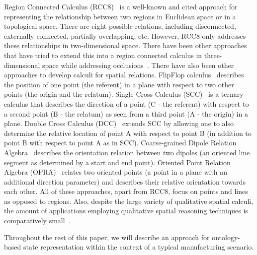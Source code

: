 \documentclass[final,1p,times]{elsarticle}
\begin{document}
Region Connected Calculus (RCC8)~\cite{Wolter.KR.2000} is a well-known and cited approach for representing the relationship between two regions in Euclidean space or in a topological space. There are eight possible relations, including disconnected, externally connected, partially overlapping, etc. However, RCC8 only addresses these relationships in two-dimensional space. There have been other approaches that have tried to extend this into a region connected calculus in three-dimensional space while addressing occlusions~\cite{Albath.CAINE.2010}. There have also been other approaches to develop calculi for spatial relations. FlipFlop calculus~\cite{Ligozat.1993} describes the position of one point (the referent) in a plane with respect to two other points (the origin and the relatum). Single Cross Calculus (SCC)~\cite{Freksa.LNCS.1992}  is a ternary calculus that describes the direction of a point (C - the referent) with respect to a second point (B - the relatum) as seen from a third point (A - the origin) in a plane. Double Cross Calculus (DCC)~\cite{Freksa.LNCS.1992} extends SCC by allowing one to also determine the relative location of point A with respect to point B (in addition to point B with respect to point A as in SCC). Coarse-grained Dipole Relation Algebra~\cite{Schlieder.1995} describes the orientation relation between two dipoles (an oriented line segment as determined by a start and end point). Oriented Point Relation Algebra (OPRA)~\cite{Moratz.IJCAI.2005} relates two oriented points (a point in a plane with an additional direction parameter) and describes their relative orientation towards each other. All of these approaches, apart from RCC8, focus on points and lines as opposed to regions. Also, despite the large variety of qualitative spatial calculi, the amount of applications employing qualitative spatial reasoning techniques is comparatively small~\cite{Wallgrun.ICSC.2007}.

Throughout the rest of this paper, we will describe an approach for ontology-based state representation within the context of a typical manufacturing scenario.

\end{document}
